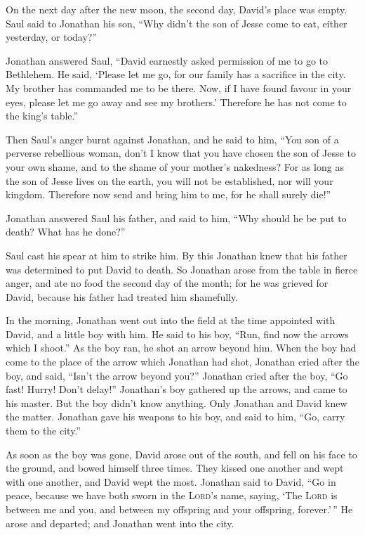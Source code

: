  On the next day after the new moon, the second day,
David's place was empty. Saul said to Jonathan his son, ``Why didn't the
son of Jesse come to eat, either yesterday, or today?''

 Jonathan answered Saul, ``David earnestly asked
permission of me to go to Bethlehem.  He said, `Please
let me go, for our family has a sacrifice in the city. My brother has
commanded me to be there. Now, if I have found favour in your eyes,
please let me go away and see my brothers.' Therefore he has not come to
the king's table.''

 Then Saul's anger burnt against Jonathan, and he said to
him, ``You son of a perverse rebellious woman, don't I know that you
have chosen the son of Jesse to your own shame, and to the shame of your
mother's nakedness?  For as long as the son of Jesse
lives on the earth, you will not be established, nor will your kingdom.
Therefore now send and bring him to me, for he shall surely die!''

 Jonathan answered Saul his father, and said to him,
``Why should he be put to death? What has he done?''

 Saul cast his spear at him to strike him. By this
Jonathan knew that his father was determined to put David to death.
 So Jonathan arose from the table in fierce anger, and
ate no food the second day of the month; for he was grieved for David,
because his father had treated him shamefully.

 In the morning, Jonathan went out into the field at the
time appointed with David, and a little boy with him.  He
said to his boy, ``Run, find now the arrows which I shoot.'' As the boy
ran, he shot an arrow beyond him.  When the boy had come
to the place of the arrow which Jonathan had shot, Jonathan cried after
the boy, and said, ``Isn't the arrow beyond you?'' 
Jonathan cried after the boy, ``Go fast! Hurry! Don't delay!''
Jonathan's boy gathered up the arrows, and came to his master.
 But the boy didn't know anything. Only Jonathan and
David knew the matter.  Jonathan gave his weapons to his
boy, and said to him, ``Go, carry them to the city.''

 As soon as the boy was gone, David arose out of the
south, and fell on his face to the ground, and bowed himself three
times. They kissed one another and wept with one another, and David wept
the most.  Jonathan said to David, ``Go in peace, because
we have both sworn in the \textsc{Lord}'s name, saying, `The
\textsc{Lord} is between me and you, and between my offspring and your
offspring, forever.'\,'' He arose and departed; and Jonathan went into
the city.


